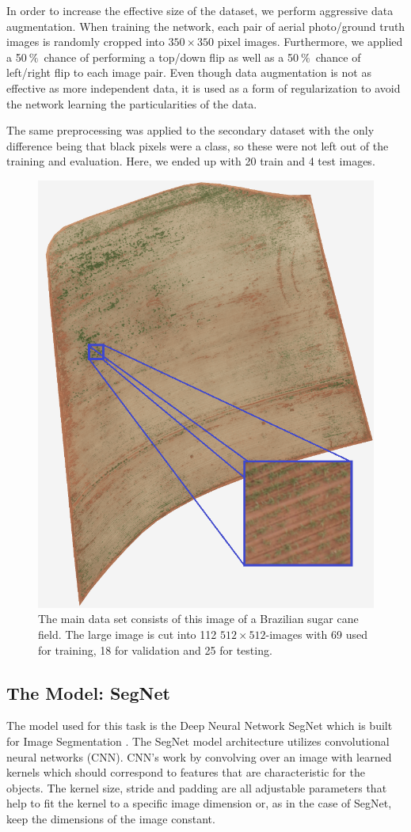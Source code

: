 \documentclass{article}
\newcommand{\pro}{\ensuremath{\ \%}}
\begin{document}
In order to increase the effective size of the dataset, we perform aggressive data augmentation.
When training the network, each pair of aerial photo/ground truth images is randomly cropped into $ 350\times 350 $ pixel images.
Furthermore, we applied a 50\pro\ chance of performing a top/down flip as well as a 50\pro\ chance of left/right flip to each image pair.
Even though data augmentation is not as effective as more independent data, it is used as a form of regularization to avoid the network learning the particularities of the data.

The same preprocessing was applied to the secondary dataset with the only difference being that black pixels were a class, so these were not left out of the training and evaluation.
Here, we ended up with 20 train and 4 test images.
\begin{figure}[!h]
	\centering
	\includegraphics[width=0.5\linewidth]{../../poster/raw-min3}
	\caption{The main data set consists of this image of a Brazilian sugar cane field. The large image is cut into 112 \(512\times512\)-images with 69 used for training, 18 for validation and 25 for testing. }
	\label{fig:raw-min2}
\end{figure}

\subsection{The Model: SegNet}
%
The model used for this task is the Deep Neural Network SegNet which is built for Image Segmentation \cite{seg}.
The SegNet model architecture utilizes convolutional neural networks (CNN). 
CNN's work by convolving over an image with learned kernels which should correspond to features that are characteristic for the objects.
The kernel size, stride and padding are all adjustable parameters that help to fit the kernel to a specific image dimension or, as in the case of SegNet, keep the dimensions of the image constant. 
\end{document}

